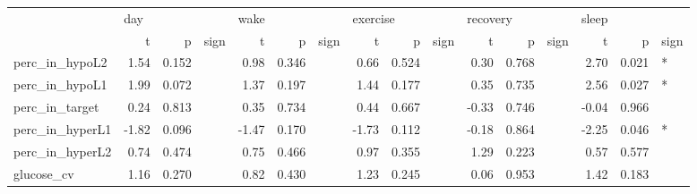 \begin{tabular}{lrrlrrlrrlrrlrrl}
\toprule
{} & \multicolumn{3}{l}{day} & \multicolumn{3}{l}{wake} & \multicolumn{3}{l}{exercise} & \multicolumn{3}{l}{recovery} & \multicolumn{3}{l}{sleep} \\
{} &     t &      p & sign &     t &      p & sign &        t &      p & sign &        t &      p & sign &     t &      p & sign \\
\midrule
perc_in_hypoL2  &  1.54 &  0.152 &      &  0.98 &  0.346 &      &     0.66 &  0.524 &      &     0.30 &  0.768 &      &  2.70 &  0.021 &    * \\
perc_in_hypoL1  &  1.99 &  0.072 &      &  1.37 &  0.197 &      &     1.44 &  0.177 &      &     0.35 &  0.735 &      &  2.56 &  0.027 &    * \\
perc_in_target  &  0.24 &  0.813 &      &  0.35 &  0.734 &      &     0.44 &  0.667 &      &    -0.33 &  0.746 &      & -0.04 &  0.966 &      \\
perc_in_hyperL1 & -1.82 &  0.096 &      & -1.47 &  0.170 &      &    -1.73 &  0.112 &      &    -0.18 &  0.864 &      & -2.25 &  0.046 &    * \\
perc_in_hyperL2 &  0.74 &  0.474 &      &  0.75 &  0.466 &      &     0.97 &  0.355 &      &     1.29 &  0.223 &      &  0.57 &  0.577 &      \\
glucose_cv      &  1.16 &  0.270 &      &  0.82 &  0.430 &      &     1.23 &  0.245 &      &     0.06 &  0.953 &      &  1.42 &  0.183 &      \\
\bottomrule
\end{tabular}
